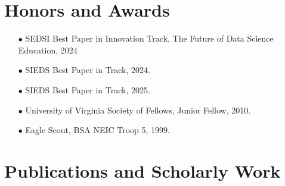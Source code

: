 \documentclass{article}[10pt]
\begin{document}
\section*{Honors and Awards}
\begin{itemize}
\item [$\bullet$] SEDSI Best Paper in Innovation Track, The Future of Data Science Education, 2024
\item [$\bullet$] SIEDS Best Paper in Track, 2024.
\item [$\bullet$] SIEDS Best Paper in Track, 2025.
\item [$\bullet$] University of Virginia Society of Fellows, Junior Fellow, 2010.
\item [$\bullet$] Eagle Scout, BSA NEIC Troop 5, 1999.
\end{itemize}


\section*{Publications and Scholarly Work}
\end{document}
